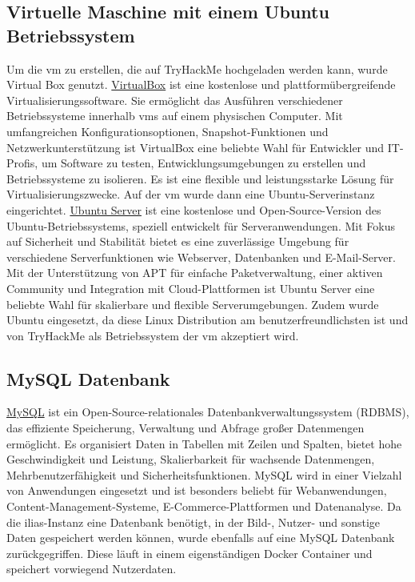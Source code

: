 \documentclass[10pt, a4paper,onecolumn ,titlepage]{article}
\begin{document}
    \subsection{Virtuelle Maschine mit einem Ubuntu Betriebssystem}
    \label{subsec:ubuntu}
    Um die \ac{vm} zu erstellen, die auf TryHackMe hochgeladen werden kann, wurde Virtual Box genutzt.
    \href{https://www.virtualbox.org/}{VirtualBox} ist eine kostenlose und plattformübergreifende Virtualisierungssoftware.
    Sie ermöglicht das Ausführen verschiedener Betriebssysteme innerhalb \ac{vm}s auf einem physischen Computer.
    Mit umfangreichen Konfigurationsoptionen, Snapshot-Funktionen und Netzwerkunterstützung ist VirtualBox eine beliebte Wahl für Entwickler und IT-Profis, um Software zu testen, Entwicklungsumgebungen zu erstellen und Betriebssysteme zu isolieren.
    Es ist eine flexible und leistungsstarke Lösung für Virtualisierungszwecke.
    Auf der \ac{vm} wurde dann eine Ubuntu-Serverinstanz eingerichtet.
    \href{https://ubuntu.com/server}{Ubuntu Server} ist eine kostenlose und Open-Source-Version des Ubuntu-Betriebssystems, speziell entwickelt für Serveranwendungen.
    Mit Fokus auf Sicherheit und Stabilität bietet es eine zuverlässige Umgebung für verschiedene Serverfunktionen wie Webserver, Datenbanken und E-Mail-Server.
    Mit der Unterstützung von APT für einfache Paketverwaltung, einer aktiven Community und Integration mit Cloud-Plattformen ist Ubuntu Server eine beliebte Wahl für skalierbare und flexible Serverumgebungen.
    Zudem wurde Ubuntu eingesetzt, da diese Linux Distribution am benutzerfreundlichsten ist und von TryHackMe als Betriebssystem der \ac{vm} akzeptiert wird.


    \subsection{MySQL Datenbank}
    \label{subsec:mysqlDatenbank}
    \href{https://www.mysql.com/}{MySQL} ist ein Open-Source-relationales Datenbankverwaltungssystem (RDBMS), das effiziente Speicherung, Verwaltung und Abfrage großer Datenmengen ermöglicht.
    Es organisiert Daten in Tabellen mit Zeilen und Spalten, bietet hohe Geschwindigkeit und Leistung, Skalierbarkeit für wachsende Datenmengen, Mehrbenutzerfähigkeit und Sicherheitsfunktionen.
    MySQL wird in einer Vielzahl von Anwendungen eingesetzt und ist besonders beliebt für Webanwendungen, Content-Management-Systeme, E-Commerce-Plattformen und Datenanalyse.
    Da die \ac{ilias}-Instanz eine Datenbank benötigt, in der Bild-, Nutzer- und sonstige Daten gespeichert werden können, wurde ebenfalls auf eine MySQL Datenbank zurückgegriffen.
    Diese läuft in einem eigenständigen Docker Container und speichert vorwiegend Nutzerdaten.
\end{document}
